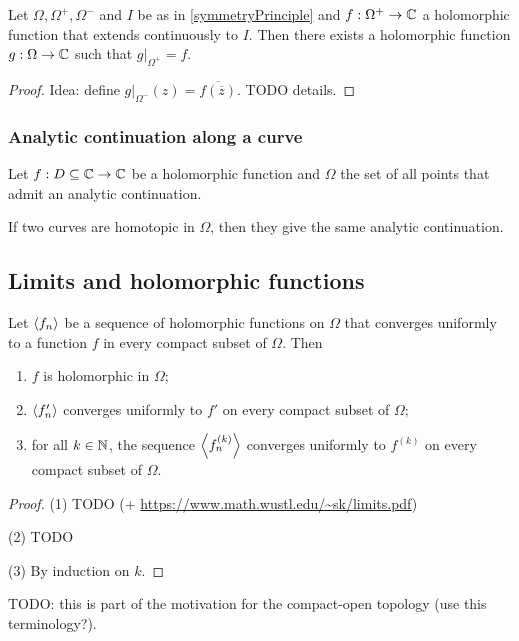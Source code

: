 \begin{proposition}
Let $\Omega, \Omega^+, \Omega^-$ and $I$ be as in \ref{symmetryPrinciple} and $f: \Omega^+ \to \mathbb{C}$ a holomorphic function that extends continuously to $I$. Then there exists a holomorphic function $g: \Omega\to \mathbb{C}$ such that $g|_{\Omega^+} = f$.
\end{proposition}
\begin{proof}
Idea: define $g|_{\Omega^-}(z) = \overline{f(\overline{z})}$. TODO details.
\end{proof}

\subsubsection{Analytic continuation along a curve}
\begin{theorem}
Let $f:D\subseteq \mathbb{C} \to \mathbb{C}$ be a holomorphic function and $\Omega$ the set of all points that admit an analytic continuation.

If two curves are homotopic in $\Omega$, then they give the same analytic continuation.
\end{theorem}

\subsection{Limits and holomorphic functions}
\begin{proposition}
Let $\left\langle f_n \right\rangle$ be a sequence of holomorphic functions on $\Omega$ that converges uniformly to a function $f$ in every compact subset of $\Omega$. Then
\begin{enumerate}
\item $f$ is holomorphic in $\Omega$;
\item $\left\langle f_n' \right\rangle$ converges uniformly to $f'$ on every compact subset of $\Omega$;
\item for all $k\in \mathbb{N}$, the sequence $\left\langle f_n^{(k)} \right\rangle$ converges uniformly to $f^{(k)}$ on every compact subset of $\Omega$.
\end{enumerate}
\end{proposition}
\begin{proof}
(1) TODO (+ \url{https://www.math.wustl.edu/~sk/limits.pdf})

(2) TODO

(3) By induction on $k$.
\end{proof}
TODO: this is part of the motivation for the compact-open topology (use this terminology?).

